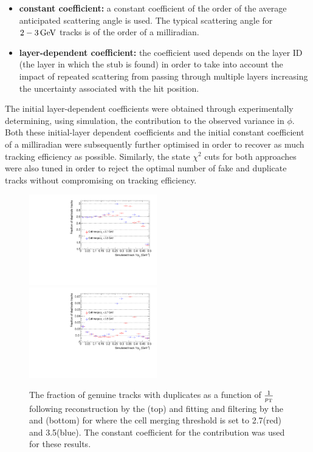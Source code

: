 \begin{itemize}
\item \textbf{constant coefficient:} a constant coefficient of the order of the average anticipated scattering angle is used. The typical scattering angle for $2-3\,\text{Ge\hspace{-.08em}V}$ tracks is of the order of a milliradian.
\item \textbf{layer-dependent coefficient:} the coefficient used depends on the layer ID (\ie the layer in which the stub is found) in order to take into account the impact of repeated scattering from passing through multiple layers increasing the uncertainty associated with the hit position.
\end{itemize}

The initial layer-dependent coefficients were obtained through experimentally determining, using simulation, the \MS contribution to the observed variance in $\phi$.
Both these initial-layer dependent coefficients and the initial constant coefficient of a milliradian were subsequently further optimised in order to recover as much tracking efficiency as  possible.
Similarly, the \KF state $\chi^{2}$ cuts for both approaches were also tuned in order to reject the optimal number of fake and duplicate tracks without compromising on tracking efficiency.

\begin{figure}[htb]
\centering
\includegraphics[width=0.495\textwidth]{figs/tk-upgrade/results-lowPtTracking/htFracDuplicatesVsInvPtTiltedGeometry_5000.pdf}
\includegraphics[width=0.495\textwidth]{figs/tk-upgrade/results-lowPtTracking/kfFracDuplicatesVsInvPtTiltedGeometry_5000.pdf}
\caption{The fraction of genuine tracks with duplicates as a function of $\frac{1}{p_{\mathrm{T}}}$ following reconstruction by the \HT (top) and fitting and filtering by the \KF and \DR (bottom) for where the \HT cell merging \pT threshold is set to 2.7\GeV (red) and 3.5\GeV (blue). 
The constant coefficient for the \MS contribution was used for these \KF results.
}
\label{fig:2GeVfracDups}
\end{figure}


